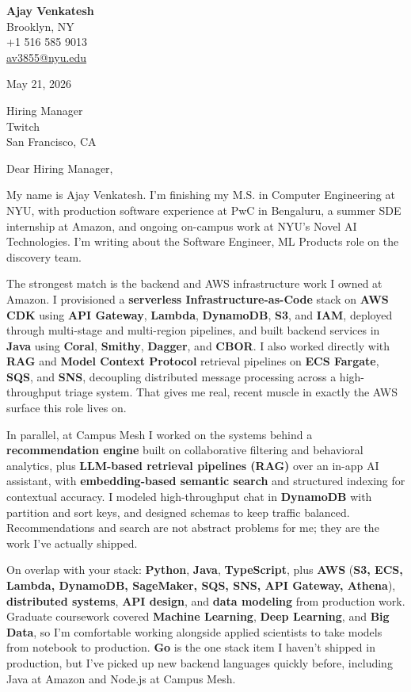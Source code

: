 \documentclass[letterpaper,11pt]{article}
\begin{document}
\begin{flushleft}
\textbf{\large Ajay Venkatesh} \\
Brooklyn, NY \\
+1 516 585 9013 \\
\href{mailto:av3855@nyu.edu}{av3855@nyu.edu}
\end{flushleft}
\vspace{10pt}
May 21, 2026
\vspace{6pt}

Hiring Manager \\
Twitch \\
San Francisco, CA

\vspace{10pt}

Dear Hiring Manager,

My name is Ajay Venkatesh. I'm finishing my M.S. in Computer Engineering at NYU, with production software experience at PwC in Bengaluru, a summer SDE internship at Amazon, and ongoing on-campus work at NYU's Novel AI Technologies. I'm writing about the Software Engineer, ML Products role on the discovery team.

The strongest match is the backend and AWS infrastructure work I owned at Amazon. I provisioned a \textbf{serverless Infrastructure-as-Code} stack on \textbf{AWS CDK} using \textbf{API Gateway}, \textbf{Lambda}, \textbf{DynamoDB}, \textbf{S3}, and \textbf{IAM}, deployed through multi-stage and multi-region pipelines, and built backend services in \textbf{Java} using \textbf{Coral}, \textbf{Smithy}, \textbf{Dagger}, and \textbf{CBOR}. I also worked directly with \textbf{RAG} and \textbf{Model Context Protocol} retrieval pipelines on \textbf{ECS Fargate}, \textbf{SQS}, and \textbf{SNS}, decoupling distributed message processing across a high-throughput triage system. That gives me real, recent muscle in exactly the AWS surface this role lives on.

In parallel, at Campus Mesh I worked on the systems behind a \textbf{recommendation engine} built on collaborative filtering and behavioral analytics, plus \textbf{LLM-based retrieval pipelines (RAG)} over an in-app AI assistant, with \textbf{embedding-based semantic search} and structured indexing for contextual accuracy. I modeled high-throughput chat in \textbf{DynamoDB} with partition and sort keys, and designed schemas to keep traffic balanced. Recommendations and search are not abstract problems for me; they are the work I've actually shipped.

On overlap with your stack: \textbf{Python}, \textbf{Java}, \textbf{TypeScript}, plus \textbf{AWS} (\textbf{S3, ECS, Lambda, DynamoDB, SageMaker, SQS, SNS, API Gateway, Athena}), \textbf{distributed systems}, \textbf{API design}, and \textbf{data modeling} from production work. Graduate coursework covered \textbf{Machine Learning}, \textbf{Deep Learning}, and \textbf{Big Data}, so I'm comfortable working alongside applied scientists to take models from notebook to production. \textbf{Go} is the one stack item I haven't shipped in production, but I've picked up new backend languages quickly before, including Java at Amazon and Node.js at Campus Mesh.
\end{document}
